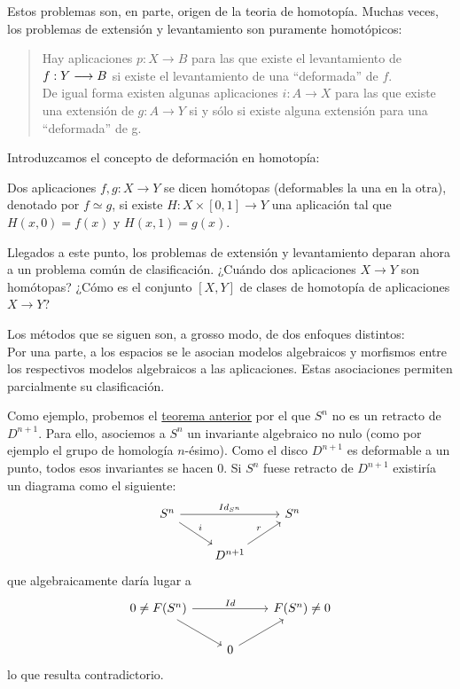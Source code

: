Estos problemas son, en parte, origen de la teoria de homotopía. Muchas veces, los problemas de extensión y levantamiento son puramente homotópicos: \par
\begin{quotation}
Hay aplicaciones $p : X \longrightarrow B$ para las que existe el levantamiento de $f : \nobreak Y \longrightarrow B$ si existe el levantamiento de una ``deformada'' de $f$. \\
De igual forma existen algunas aplicaciones $i : A \longrightarrow X$ para las que existe una extensión de $g : A \longrightarrow Y$ si y sólo si existe alguna extensión para una ``deformada'' de g.
\end{quotation}
Introduzcamos el concepto de deformación en homotopía:
\begin{defin}
Dos aplicaciones $f, g : X \longrightarrow Y$ se dicen homótopas (deformables la una en la otra), denotado por $f \simeq g$, si existe  $H : X \times [0,1] \longrightarrow Y$ una aplicación tal que $H(x ,0) = f(x)$ y $H(x, 1) = g(x)$.
\end{defin}
Llegados a este punto, los problemas de extensión y levantamiento deparan ahora a un problema común de clasificación. ¿Cuándo dos aplicaciones $X \longrightarrow Y$ son homótopas? ¿Cómo es el conjunto $[X, Y]$ de clases de homotopía de aplicaciones $X \longrightarrow Y$? \par 
Los métodos que se siguen son, a grosso modo, de dos enfoques distintos:\\
Por una parte, a los espacios se le asocian modelos algebraicos y morfismos entre los respectivos modelos algebraicos a las aplicaciones. Estas asociaciones permiten parcialmente su clasificación. \par 
Como ejemplo, probemos el \hyperlink{c1t:retractoh}{teorema anterior} por el que $S^n$ no es un retracto de $D^{n+1}$. Para ello, asociemos a $S^n$ un invariante algebraico no nulo (como por ejemplo el grupo de homología $n$-ésimo). Como el disco $D^{n+1}$ es deformable a un punto, todos esos invariantes se hacen 0. Si $S^n$ fuese retracto de $D^{n+1}$ existiría un diagrama como el siguiente:
$$
\begin{tikzcd}
	S^n \arrow{rr}{Id_{S^n}} \drar{i} & & S^n \\
		&	D^{n+1} \urar{r} & 
\end{tikzcd}
$$
que algebraicamente daría lugar a 
$$
\begin{tikzcd}
	0 \neq F(S^n) \arrow{rr}{Id} \drar & &  F(S^n) \neq 0 \\
		&	0 \urar & 
\end{tikzcd}
$$
lo que resulta contradictorio. \par

